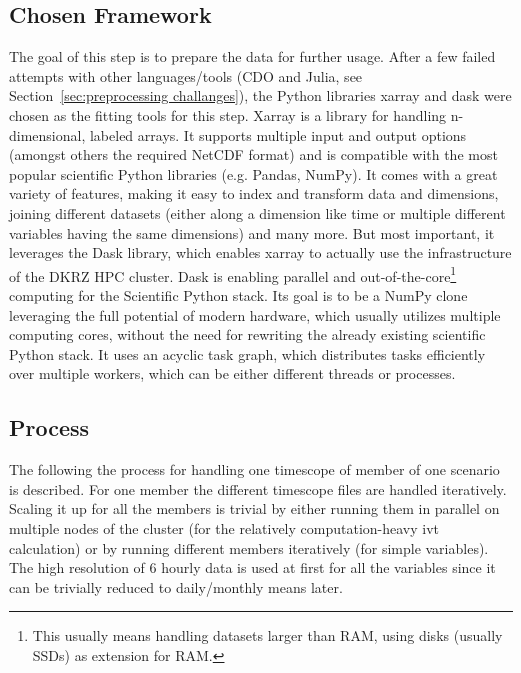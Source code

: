 \subsection{Chosen Framework}
\label{sec:preprocessing_framework}

The goal of this step is to prepare the data for further usage. 
After a few failed attempts with other languages/tools (CDO and Julia, see Section~\ref{sec:preprocessing challanges}), the Python libraries xarray \cite{hoyer_xarray_2017} and dask \cite{rocklin2015dask} were chosen as the fitting tools for this step.
Xarray is a library for handling n-dimensional, labeled arrays. It supports multiple input and output options (amongst others the required NetCDF format) and is compatible with the most popular scientific Python libraries (e.g. Pandas, NumPy). 
It comes with a great variety of features, making it easy to index and transform data and dimensions, joining different datasets (either along a dimension like time or multiple different variables having the same dimensions) and many more. 
But most important, it leverages the Dask library, which enables xarray to actually use the infrastructure of the DKRZ HPC cluster. 
Dask is enabling parallel and out-of-the-core\footnote{This usually means handling datasets larger than RAM, using disks (usually SSDs) as extension for RAM.} computing for the Scientific Python stack. 
Its goal is to be a NumPy clone leveraging the full potential of modern hardware, which usually utilizes multiple computing cores, without the need for rewriting the already existing scientific Python stack. 
It uses an acyclic task graph, which distributes tasks efficiently over multiple workers, which can be either different threads or processes. \cite{rocklin2015dask}


\subsection{Process}

The following the process for handling one timescope of member of one scenario is described. For one member the different timescope files are handled iteratively. 
Scaling it up for all the members is trivial by either running them in parallel on multiple nodes of the cluster (for the relatively computation-heavy \ac{ivt} calculation) or by running different members iteratively (for simple variables). 
The high resolution of 6 hourly data is used at first for all the variables since it can be trivially reduced to daily/monthly means later. 

